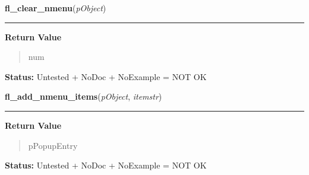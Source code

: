     \label{xformslib:library:fl_clear_nmenu}

    \vspace{0.5ex}

\hspace{.8\funcindent}\begin{boxedminipage}{\funcwidth}

    \raggedright \textbf{fl\_clear\_nmenu}(\textit{pObject})

    \vspace{-1.5ex}

    \rule{\textwidth}{0.5\fboxrule}
\setlength{\parskip}{2ex}
\setlength{\parskip}{1ex}
      \textbf{Return Value}
    \vspace{-1ex}

      \begin{quote}
      num

      \end{quote}

\textbf{Status:} Untested + NoDoc + NoExample = NOT OK



    \end{boxedminipage}

    \label{xformslib:library:fl_add_nmenu_items}

    \vspace{0.5ex}

\hspace{.8\funcindent}\begin{boxedminipage}{\funcwidth}

    \raggedright \textbf{fl\_add\_nmenu\_items}(\textit{pObject}, \textit{itemstr})

    \vspace{-1.5ex}

    \rule{\textwidth}{0.5\fboxrule}
\setlength{\parskip}{2ex}
\setlength{\parskip}{1ex}
      \textbf{Return Value}
    \vspace{-1ex}

      \begin{quote}
      pPopupEntry

      \end{quote}

\textbf{Status:} Untested + NoDoc + NoExample = NOT OK



    \end{boxedminipage}

